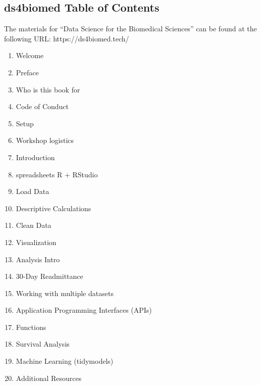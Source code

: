 \documentclass[030-workshop.tex]{subfiles}
\begin{document}
\subsection{ds4biomed Table of Contents}
\label{sse:ds4biomed-toc}

The materials for ``Data Science for the Biomedical Sciences'' can be found at the following URL:
https://ds4biomed.tech/

\begin{enumerate}
    \item Welcome
    \item Preface
    \item Who is this book for
    \item Code of Conduct
    \item Setup
    \item Workshop logistics
    \item Introduction
    \item spreadsheets R + RStudio
    \item Load Data
    \item Descriptive Calculations
    \item Clean Data
    \item Visualization
    \item Analysis Intro
    \item 30-Day Readmittance
    \item Working with multiple datasets
    \item Application Programming Interfaces (APIs)
    \item Functions
    \item Survival Analysis
    \item Machine Learning (tidymodels)
    \item Additional Resources
  \end{enumerate}
\end{document}
